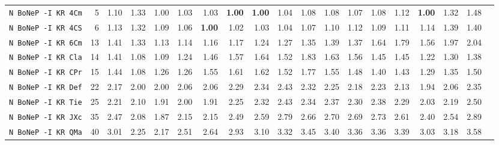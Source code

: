 \begin{tabular}{l | r @{~~} r | r@{~~}r@{~~}r@{~~}r@{~~}r@{~~}r@{~~}r@{~~}r@{~~}r@{~~}r@{~~}r@{~~}r@{~~}r@{~~}r@{~~}r@{~~}r|}
\verb+N BoNeP -I KR 4Cm+ & 5 & 1.10 & 1.33&1.00&1.03&1.03&\textbf{1.00}&\textbf{1.00}&1.04&1.08&1.08&1.07&1.08&1.12&\textbf{1.00}&1.32&1.48\\
\verb+N BoNeP -I KR 4CS+ & 6 & 1.13 & 1.32&1.09&1.06&\textbf{1.00}&1.02&1.03&1.04&1.07&1.10&1.12&1.09&1.11&1.14&1.39&1.40\\
\verb+N BoNeP -I KR 6Cm+ & 13 & 1.41 & 1.33&1.13&1.14&1.16&1.17&1.24&1.27&1.35&1.39&1.37&1.64&1.79&1.56&1.97&2.04\\
\verb+N BoNeP -I KR Cla+ & 14 & 1.41 & 1.08&1.09&1.24&1.46&1.57&1.64&1.52&1.83&1.63&1.56&1.45&1.45&1.22&1.30&1.38\\
\verb+N BoNeP -I KR CPr+ & 15 & 1.44 & 1.08&1.26&1.26&1.55&1.61&1.62&1.52&1.77&1.55&1.48&1.40&1.43&1.29&1.35&1.50\\
\verb+N BoNeP -I KR Def+ & 22 & 2.17 & 2.00&2.00&2.06&2.06&2.29&2.34&2.43&2.32&2.25&2.18&2.23&2.13&1.94&2.06&2.35\\
\verb+N BoNeP -I KR Tie+ & 25 & 2.21 & 2.10&1.91&2.00&1.91&2.25&2.32&2.43&2.34&2.37&2.30&2.38&2.29&2.03&2.19&2.50\\
\verb+N BoNeP -I KR JXc+ & 35 & 2.47 & 2.08&1.87&2.15&2.15&2.49&2.59&2.79&2.66&2.70&2.69&2.73&2.61&2.40&2.54&2.89\\
\verb+N BoNeP -I KR QMa+ & 40 & 3.01 & 2.25&2.17&2.51&2.64&2.93&3.10&3.32&3.45&3.40&3.36&3.36&3.39&3.03&3.18&3.58\\
\end{tabular}
